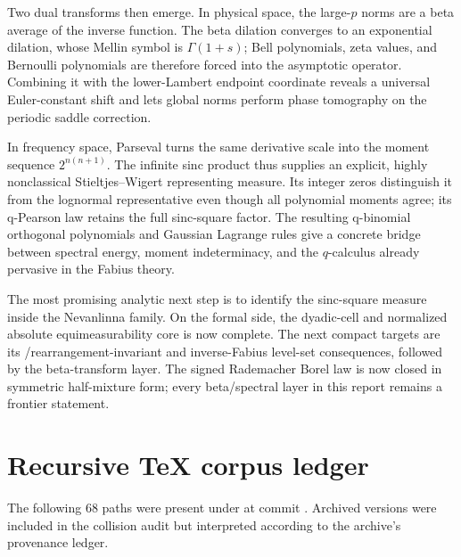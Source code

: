 \documentclass[11pt,oneside]{article}
\theoremstyle{definition}
\theoremstyle{remark}
\begin{document}
Two dual transforms then emerge.  In physical space, the large-$p$ norms are a beta average
of the inverse function.  The beta dilation converges to an exponential dilation, whose
Mellin symbol is $\Gamma(1+s)$; Bell polynomials, zeta values, and Bernoulli polynomials are
therefore forced into the asymptotic operator.  Combining it with the lower-Lambert endpoint
coordinate reveals a universal Euler-constant shift and lets global norms perform phase
tomography on the periodic saddle correction.

In frequency space, Parseval turns the same derivative scale into the moment sequence
$2^{n(n+1)}$.  The infinite sinc product thus supplies an explicit, highly nonclassical
Stieltjes--Wigert representing measure.  Its integer zeros distinguish it from the lognormal
representative even though all polynomial moments agree; its q-Pearson law retains the full
sinc-square factor.  The resulting q-binomial orthogonal polynomials and Gaussian Lagrange
rules give a concrete bridge between spectral energy, moment indeterminacy, and the
$q$-calculus already pervasive in the Fabius theory.

The most promising analytic next step is to identify the sinc-square measure inside the
Nevanlinna family.  On the formal side, the dyadic-cell and normalized absolute
equimeasurability core is now complete.  The next compact targets are its
/rearrangement-invariant and inverse-Fabius level-set consequences, followed
by the beta-transform layer.  The signed Rademacher Borel law is now closed in symmetric
half-mixture form; every beta/spectral layer in this report remains a frontier statement.

\appendix

\section{Recursive TeX corpus ledger}
\label{p4:app:corpus-ledger}

The following $68$ paths were present under
 at commit \RepoCommit.  Archived versions were included
in the collision audit but interpreted according to the archive's provenance ledger.
\end{document}
